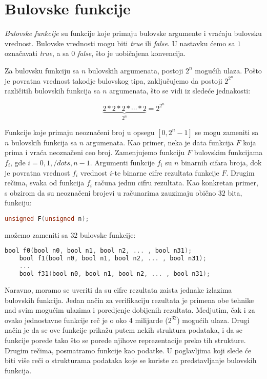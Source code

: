 \section{Bulovske funkcije}
\label{sec:BulovskeFunkcije}

\emph{Bulovske funkcije} su funkcije koje primaju bulovske argumente i vra\'c{}aju bulovsku vrednost. Bulovske vrednosti mogu biti \emph{true} ili \emph{false}. U nastavku \'c{}emo sa $1$ ozna\v{c}avati \emph{true}, a sa $0$ \emph{false}, \v{s}to je uobi\v{c}ajena konvencija.

Za bulovsku funkciju sa $n$ bulovskih argumenata, postoji $2^{n}$ mogu\'c{}ih ulaza. Po\v{s}to je povratna vrednost takodje bulovskog tipa, zaklju\v{c}ujemo da postoji $2^{2^{n}}$ razli\v{c}itih bulovskih funkcija sa $n$ argumenata, \v{s}to se vidi iz slede\'c{}e jednakosti:

\[ \underbrace{2*2*2* \dotsb *2}_{\text{$2^{n}$}} = 2^{2^{n}} \]

Funkcije koje primaju neozna\v{c}eni broj u opsegu $[0,2^{n}-1]$ se mogu zameniti sa $n$ bulovskih funkcija sa $n$ argumenata. Kao primer, neka je data funkcija $F$ koja prima i vra\'c{}a neozna\v{c}eni ceo broj. Zamenjujemo funkciju $F$ bulovskim funkcijama $f_i$, gde $i = 0, 1, /dots , n-1$. Argumenti funkcije $f_{i}$ su $n$ binarnih cifara broja, dok je povratna vrednost $f_{i}$ vrednost $i$-te binarne cifre rezultata funkcije $F$. Drugim re\v{c}ima, svaka od funkcija $f_{i}$ ra\v{c}una jednu cifru rezultata. Kao konkretan primer, s obzirom da su neozna\v{c}eni brojevi u ra\v{c}unarima zauzimaju obi\v{c}no $32$ bita, funkciju:

\begin{lstlisting}[language=C++]
    unsigned F(unsigned n);
\end{lstlisting}

\noindent mo\v{z}emo zameniti sa $32$ bulovske funkcije:

\begin{lstlisting}[language=C, emph={bool}]
    bool f0(bool n0, bool n1, bool n2, ... , bool n31);
    bool f1(bool n0, bool n1, bool n2, ... , bool n31);
    ...
    bool f31(bool n0, bool n1, bool n2, ... , bool n31);
\end{lstlisting}

Naravno, moramo se uveriti da su cifre rezultata zaista jednake izlazima bulovskih funkcija. Jedan na\v{c}in za verifikaciju rezultata je primena obe tehnike nad svim mogu\'c{}im ulazima i poredjenje dobijenih rezultata. Medjutim, \v{c}ak i za ovako jednostavne funkcije re\v{c} je o oko 4 milijarde ($2^{32}$) mogu\'c{}ih ulaza. Drugi na\v{c}in je da se ove funkcije prika\v{z}u putem nekih struktura podataka, i da se funkcije porede tako \v{s}to se porede njihove reprezentacije preko tih strukture. Drugim re\v{c}ima, posmatramo funkcije kao podatke. U poglavljima koji slede \'c{}e biti vi\v{s}e re\v{c}i o strukturama podataka koje se koriste za predstavljanje bulovskih funkcija.
